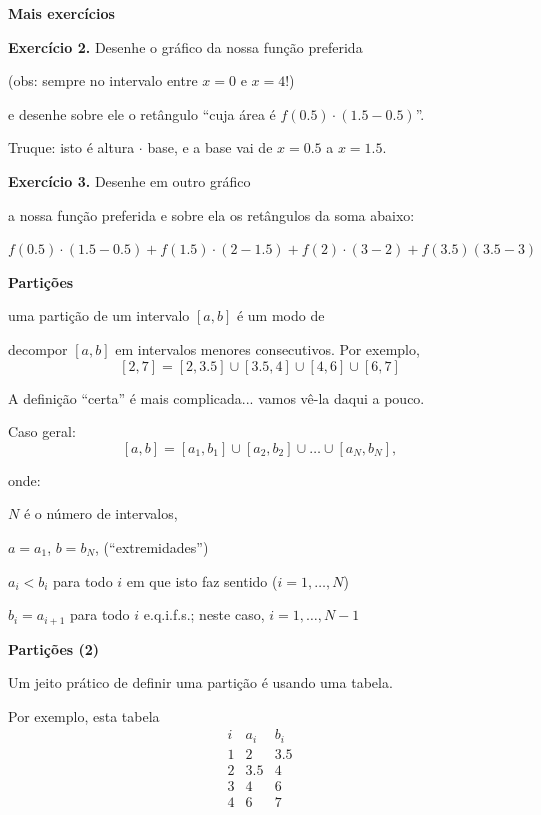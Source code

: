 \documentclass[oneside,12pt]{article}
\begin{document}
{\bf Mais exercícios}

{\bf Exercício 2.} Desenhe o gráfico da nossa função preferida

(obs: sempre no intervalo entre $x=0$ e $x=4$!)

e desenhe sobre ele o retângulo ``cuja área é $f(0.5)·(1.5-0.5)$''.

Truque: isto é altura $·$ base, e a base vai de $x=0.5$ a $x=1.5$.

\msk

{\bf Exercício 3.} Desenhe em outro gráfico

a nossa função preferida e sobre ela os retângulos da soma abaixo:

$f(0.5)·(1.5-0.5) + f(1.5)·(2-1.5) + f(2)·(3-2) + f(3.5)(3.5-3)$

\newpage


{\bf Partições}

 uma partição de um intervalo $[a,b]$ é um
modo de

decompor $[a,b]$ em intervalos menores consecutivos. Por exemplo,
%
$$[2,7] = [2,3.5]∪[3.5,4]∪[4,6]∪[6,7]$$

A definição ``certa'' é mais complicada... vamos vê-la daqui a pouco.

Caso geral:
%
$$[a,b] = [a_1,b_1]∪[a_2,b_2]∪\ldots∪[a_N,b_N],$$

onde:

$N$ é o número de intervalos,

$a=a_1$, $b=b_N$, (``extremidades'')

$a_i<b_i$ para todo $i$ em que isto faz sentido ($i=1,\ldots,N$)

$b_i=a_{i+1}$ para todo $i$ e.q.i.f.s.; neste caso, $i=1,\ldots,N-1$

\newpage


{\bf Partições (2)}

Um jeito prático de definir uma partição é usando uma tabela.

Por exemplo, esta tabela
%
$$\begin{array}{ccc}
  i & a_i & b_i \\\hline
  1 & 2 & 3.5 \\
  2 & 3.5 & 4 \\
  3 & 4 & 6 \\
  4 & 6 & 7 \\
  \end{array}
$$
\end{document}
